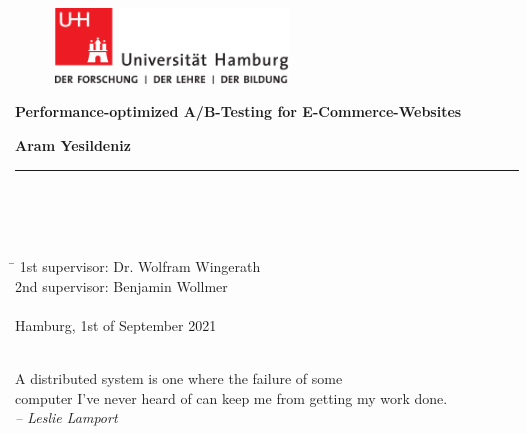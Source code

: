 \begin{titlepage}

  \setcounter{page}{-1}

	\begin{figure}[h]
		\begin{minipage}[b]{62mm}
			\includegraphics[width=62mm]{images/unilogo}
		\end{minipage}
		\hspace{4cm}
	\end{figure}

	\vfill
	
	\begin{center}
		\vspace{14mm}
		\noindent \textbf{\huge
		Performance-optimized A/B-Testing for E-Commerce-Websites
		}
		\vspace{60mm}	
	\end{center}
	
	\vfill
	
	\noindent \textbf{Aram Yesildeniz} \\
	\noindent \rule{\textwidth}{0.4mm} 
	 \\
	 \\
	 \\
	\begin{tabbing}
	\hspace{8em} \=  \kill
	1st supervisor: \> Dr. Wolfram Wingerath \\
	2nd supervisor: \> Benjamin Wollmer \\
	~ \\
	Hamburg, 1st of September 2021
	\end{tabbing}
	
	
	\newpage 
	\thispagestyle{empty}
	\setcounter{page}{0}

	~\\ \vfill \noindent 
	A distributed system is one where the failure of some \\
	computer I've never heard of can keep me from getting my work done. \\
	\textit{-- Leslie Lamport}
\end{titlepage}


